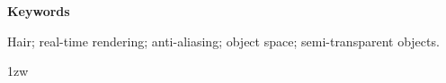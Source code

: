 % 
\vspace{4ex}

\noindent
{\bf Keywords}

\noindent
Hair; real-time rendering; anti-aliasing; object space; semi-transparent objects.
 
\parindent 1zw